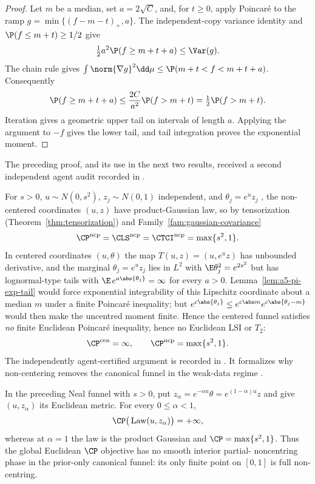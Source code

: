 \documentclass[../../main.tex]{subfiles}
\begin{document}
\begin{proof}
Let $m$ be a median, set $a=2\sqrt C$, and, for $t\ge0$, apply Poincar\'e to the ramp
$g=\min\{(f-m-t)_+,a\}$. The independent-copy variance identity and
$\P(f\le m+t)\ge1/2$ give
\[
 \tfrac12a^2\P(f\ge m+t+a)\le\Var(g).
\]
The chain rule gives
$\int\norm{\nabla g}^2\dd\mu\le\P(m+t<f<m+t+a)$. Consequently
\[
 \P(f\ge m+t+a)\le\frac{2C}{a^2}\P(f>m+t)=\tfrac12\P(f>m+t).
\]
Iteration gives a geometric upper tail on intervals of length $a$. Applying the argument to
$-f$ gives the lower tail, and tail integration proves the exponential moment.
\end{proof}

The preceding proof, and its use in the next two results, received a second independent agent
audit recorded in .

\begin{example}
\label{ex:a5-neal}
For $s>0$, $u\sim N(0,s^2)$, $z_j\sim N(0,1)$ independent, and $\theta_j=e^u z_j$
\cite{Neal2003Slice}, the non-centered coordinates $(u,z)$ have product-Gaussian law, so by
tensorization (Theorem~\ref{thm:tensorization}) and Family~\ref{fam:gaussian-covariance}
\[
  \CP^{\mathrm{ncp}}=\CLS^{\mathrm{ncp}}=\CTCI^{\mathrm{ncp}}=\max\{s^2,1\}.
\]
In centered coordinates $(u,\theta)$ the map $T(u,z)=(u,e^uz)$ has unbounded derivative, and the
marginal $\theta_j=e^uz_j$ lies in $L^2$ with $\E\theta_j^2=e^{2s^2}$ but has lognormal-type
tails with $\E\,e^{a\abs{\theta_j}}=\infty$ for
every $a>0$. Lemma~\ref{lem:a5-pi-exp-tail} would force exponential integrability of this
Lipschitz coordinate about a median $m$ under a finite Poincar\'e inequality; but
$e^{c\abs{\theta_j}}\le e^{c\abs m}e^{c\abs{\theta_j-m}}$ would then make the uncentred moment
finite. Hence
the centered funnel satisfies \emph{no} finite Euclidean Poincar\'e inequality, hence no
Euclidean LSI or $T_2$:
\[
  \CP^{\mathrm{cen}}=\infty,
  \qquad
  \CP^{\mathrm{ncp}}=\max\{s^2,1\}.
\]
The independently agent-certified argument is recorded in
. It formalizes why non-centering removes the canonical funnel
in the weak-data regime \cite{BetancourtGirolami2015}.
\end{example}

\begin{proposition}
\label{prop:a5-partial-funnel}
In the preceding Neal funnel with $s>0$, put
$z_\alpha=e^{-\alpha u}\theta=e^{(1-\alpha)u}z$ and give $(u,z_\alpha)$ its Euclidean metric.
For every $0\le\alpha<1$,
\[
 \CP\big(\operatorname{Law}(u,z_\alpha)\big)=+\infty,
\]
whereas at $\alpha=1$ the law is the product Gaussian and
$\CP=\max\{s^2,1\}$. Thus the global Euclidean $\CP$ objective has no smooth interior partial-
noncentring phase in the prior-only canonical funnel: its only finite point on $[0,1]$ is full
non-centring.
\end{proposition}
\end{document}
